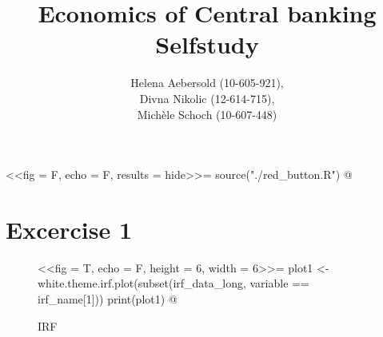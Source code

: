 \documentclass[11pt,a4paper]{report}
\begin{document}
	\title{\textbf{Economics of Central banking} \\ \vspace{40pt} Selfstudy}
	\author{Helena Aebersold (10-605-921), \\ Divna Nikolic (12-614-715), \\ Michèle Schoch (10-607-448)}
	\maketitle
	
<<fig = F, echo = F, results = hide>>=
source("./red_button.R")
@		
\newpage
\section{Excercise 1}
\begin{figure}[H]
	\caption{IRF}
	\label{ex1}
	\centering
	<<fig = T, echo = F, height = 6, width = 6>>=
	plot1 <- white.theme.irf.plot(subset(irf_data_long, variable == irf_name[1]))
	print(plot1)
	@
\end{figure}
\end{document}
